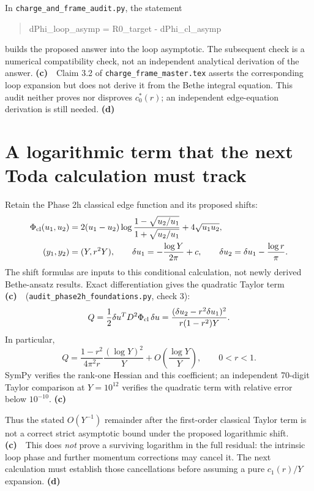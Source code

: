 \documentclass[11pt,a4paper]{article}
\newcommand{\Lc}{\textsf{\textbf{(c)}}\ }
\newcommand{\Ld}{\textsf{\textbf{(d)}}\ }
\newcommand{\scr}{\texttt{audit\_\allowbreak phase2h\_\allowbreak foundations.py}}
\begin{document}
In \texttt{charge\_and\_frame\_audit.py}, the statement
\begin{quote}\small\ttfamily
dPhi\_loop\_asymp = R0\_target - dPhi\_cl\_asymp
\end{quote}
builds the proposed answer into the loop asymptotic. The subsequent check
is a numerical compatibility check, not an independent analytical
derivation of the answer. \Lc\ Claim 3.2 of
\texttt{charge\_frame\_master.tex} asserts the corresponding loop expansion
but does not derive it from the Bethe integral equation. This audit neither
proves nor disproves $c_0^*(r)$; an independent edge-equation derivation is
still needed. \Ld

\section{A logarithmic term that the next Toda calculation must track}
Retain the Phase 2h classical edge function and its proposed shifts:
\begin{align*}
 \Phi_{\rm cl}(u_1,u_2)
 &=2(u_1-u_2)\log\frac{1-\sqrt{u_2/u_1}}{1+\sqrt{u_2/u_1}}
       +4\sqrt{u_1u_2},\\
 (y_1,y_2)&=(Y,r^2Y),\qquad
 \delta u_1=-\frac{\log Y}{2\pi}+c,\qquad
 \delta u_2=\delta u_1-\frac{\log r}{\pi}.
\end{align*}
The shift formulas are inputs to this conditional calculation, not newly
derived Bethe-ansatz results. Exact differentiation gives the quadratic
Taylor term \Lc\ (\scr, check 3):
\begin{equation}
 Q=\frac12\delta u^T D^2\Phi_{\rm cl}\,\delta u
   =\frac{(\delta u_2-r^2\delta u_1)^2}{r(1-r^2)Y}.
 \label{eq:Q}
\end{equation}
In particular,
\begin{equation}
 Q=\frac{1-r^2}{4\pi^2r}\frac{(\log Y)^2}{Y}
      +O\!\left(\frac{\log Y}{Y}\right),\qquad 0<r<1.
 \label{eq:logQ}
\end{equation}
SymPy verifies the rank-one Hessian and this coefficient; an independent
70-digit Taylor comparison at $Y=10^{12}$ verifies the quadratic term with
relative error below $10^{-10}$. \Lc

Thus the stated $O(Y^{-1})$ remainder after the first-order classical Taylor
term is not a correct strict asymptotic bound under the proposed logarithmic
shift. \Lc\ This does \emph{not} prove a surviving logarithm in the full
residual: the intrinsic loop phase and further momentum corrections may
cancel it. The next calculation must establish those cancellations before
assuming a pure $c_1(r)/Y$ expansion. \Ld
\end{document}
